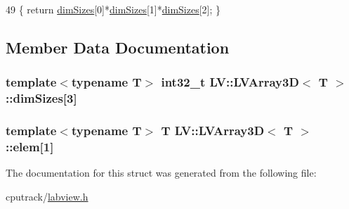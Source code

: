 \begin{DoxyCode}
49 \{ \textcolor{keywordflow}{return} \hyperlink{struct_l_v_1_1_l_v_array3_d_ac0c13d3f7638882b6c6cc23cdd5bda7e}{dimSizes}[0]*\hyperlink{struct_l_v_1_1_l_v_array3_d_ac0c13d3f7638882b6c6cc23cdd5bda7e}{dimSizes}[1]*\hyperlink{struct_l_v_1_1_l_v_array3_d_ac0c13d3f7638882b6c6cc23cdd5bda7e}{dimSizes}[2]; \}
\end{DoxyCode}


\subsection{Member Data Documentation}
\subsubsection[{\texorpdfstring{dim\+Sizes}{dimSizes}}]{\setlength{\rightskip}{0pt plus 5cm}template$<$typename T$>$ int32\+\_\+t {\bf L\+V\+::\+L\+V\+Array3D}$<$ T $>$\+::dim\+Sizes\mbox{[}3\mbox{]}}\hypertarget{struct_l_v_1_1_l_v_array3_d_ac0c13d3f7638882b6c6cc23cdd5bda7e}{}\label{struct_l_v_1_1_l_v_array3_d_ac0c13d3f7638882b6c6cc23cdd5bda7e}
\subsubsection[{\texorpdfstring{elem}{elem}}]{\setlength{\rightskip}{0pt plus 5cm}template$<$typename T$>$ T {\bf L\+V\+::\+L\+V\+Array3D}$<$ T $>$\+::elem\mbox{[}1\mbox{]}}\hypertarget{struct_l_v_1_1_l_v_array3_d_a92b60817b5622b33c6bdd38f055e0260}{}\label{struct_l_v_1_1_l_v_array3_d_a92b60817b5622b33c6bdd38f055e0260}


The documentation for this struct was generated from the following file\+:\begin{DoxyCompactItemize}
\item 
cputrack/\hyperlink{labview_8h}{labview.\+h}\end{DoxyCompactItemize}
